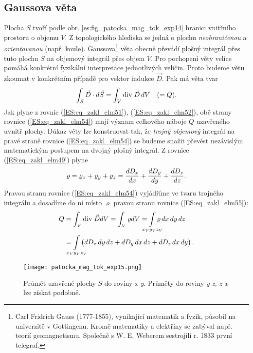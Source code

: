     \subsection{Gaussova věta}
      Plocha \(S\) tvoří podle obr. \ref{es:fig_patocka_mag_tok_exp14} hranici vnitřního prostoru o 
      objemu \(V\). Z topologického hlediska se jedná o plochu \emph{neohraničenou} a 
      \emph{orientovanou} (např. koule). Gaussova\footnote{Carl Fridrich Gauss (1777-1855), 
      vynikající matematik a fyzik, působil na univerzitě v Gottingenu. Kromě matematiky a 
      elektřiny se zabýval např. teorií geomagnetismu. Společně s W. E. Weberem sestrojili r. 1833 
      první telegraf.}  věta obecně převádí plošný integrál přes tuto plochu \(S\) na objemový 
      integrál přes objem \(V\). Pro pochopení věty velice pomáhá konkrétní fyzikální interpretace 
      jednotlivých veličin. Proto budeme větu zkoumat v konkrétním případě pro vektor indukce 
      \(\vec{D}\). Pak má věta tvar
      \begin{equation}\label{ES:eq_zakl_elm54}
        \int_S\vec{D}\cdot d\vec{S} = \int_V\mathrm{div}\;\vec{D}\,dV \quad(=Q).
      \end{equation} 
      Jak plyne z rovnic (\ref{ES:eq_zakl_elm51}), (\ref{ES:eq_zakl_elm52}), obě strany rovnice 
      (\ref{ES:eq_zakl_elm54}) mají význam celkového náboje \(Q\) uzavřeného uvnitř plochy. Důkaz 
      věty lze konstruovat tak, že \emph{trojný objemový} integrál na pravé straně rovnice 
      (\ref{ES:eq_zakl_elm54}) se budeme snažit převést nezávislým matematickým postupem na dvojný 
      plošný integrál. Z rovnice (\ref{ES:eq_zakl_elm49}) plyne
      \begin{equation}\label{ES:eq_zakl_elm55}
        \varrho = \varrho_x + \varrho_y + \varrho_z 
                = \dfrac{d D_x}{d x} + \dfrac{d D_y}{d y} + \dfrac{d D_z}{d z}. 
      \end{equation}
      Pravou stranu rovnice (\ref{ES:eq_zakl_elm54}) vyjádříme ve tvaru trojného integrálu a 
      dosadíme do ní místo \(\varrho\) pravou stranu rovnice (\ref{ES:eq_zakl_elm55}):
      \begin{align}\label{ES:eq_zakl_elm56}
        Q &= \int_V\diver{D}dV = \int_V\varrho dV 
           = \limitint_{\mathclap{x_Vy_Vz_V}}\varrho\,dx\,dy\,dz   \nonumber\\
          &= \limitint_{\mathclap{x_Vy_Vz_V}}\left(dD_x\,dy\,dz+dD_y\,dx\,dz+dD_z\,dx\,dy\right).
      \end{align}      
      \begin{figure}[ht!]
        \centering
        \texttt{[image: patocka\_mag\_tok\_exp15.png]}
        \caption{Průmět uzavřené plochy \(S\) do roviny \emph{x-y}. Průměty do roviny \emph{y-z, 
                 z-x} lze získat podobně.}
        \label{es:fig_patocka_mag_tok_exp15}
      \end{figure}
